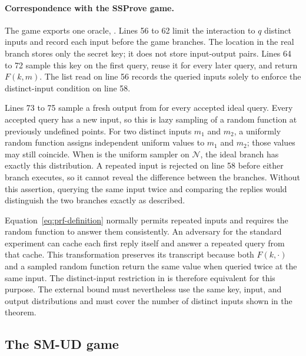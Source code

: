 \documentclass[11pt,a4paper]{article}
\theoremstyle{plain}
\theoremstyle{definition}
\DeclareRobustCommand{\coq}[1]{\texttt{\detokenize{#1}}}
\newcommand{\SSProve}{\textsf{SSProve}\xspace}
\newcommand{\prf}{\textsc{prf}\xspace}
\begin{document}


\paragraph{Correspondence with the \SSProve game.}
The game exports one oracle, \coq{FQUERY}.
Lines 56 to 62 limit the interaction to \(q\) distinct inputs and record each input before the game branches.
The location \coq{prf_k_loc} in the real branch stores only the secret key; it does not store input-output pairs.
Lines 64 to 72 sample this key on the first query, reuse it for every later query, and return \(F(k,m)\).
The list read on line 56 records the queried inputs solely to enforce the distinct-input condition on line 58.

Lines 73 to 75 sample a fresh output from \coq{kh_dN} for every accepted ideal query.
Every accepted query has a new input, so this is lazy sampling of a random function at previously undefined points.
For two distinct inputs \(m_1\) and \(m_2\), a uniformly random function assigns independent uniform values to \(m_1\) and \(m_2\); those values may still coincide.
When \coq{kh_dN} is the uniform sampler on \(\mathcal N\), the ideal branch has exactly this distribution.
A repeated input is rejected on line 58 before either branch executes, so it cannot reveal the difference between the branches.
Without this assertion, querying the same input twice and comparing the replies would distinguish the two branches exactly as described.

Equation~\eqref{eq:prf-definition} normally permits repeated inputs and requires the random function to answer them consistently.
An adversary for the standard experiment can cache each first reply itself and answer a repeated query from that cache.
This transformation preserves its transcript because both \(F(k,\cdot)\) and a sampled random function return the same value when queried twice at the same input.
The distinct-input restriction in \coq{PRF_game} is therefore equivalent for this purpose.
The external bound must nevertheless use the same key, input, and output distributions and must cover the number of distinct inputs shown in the theorem.

\subsection{The SM-UD game}
\end{document}
